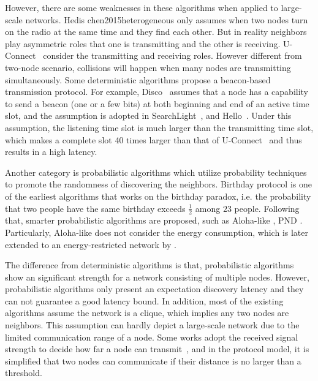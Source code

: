 However, there are some weaknesses in these algorithms when applied to large-scale networks.
Hedis {chen2015heterogeneous} only assumes when two nodes turn on the radio at the same time and they find each other. 
But in reality neighbors play asymmetric roles that one is transmitting and the other is receiving.
U-Connect~\cite{kandhalu2010u} consider the transmitting and receiving roles.
However different from two-node scenario, collisions will happen when many nodes are transmitting simultaneously. 
Some deterministic algorithms propose a beacon-based transmission protocol.
For example, Disco~\cite{dutta2008practical} assumes that a node has a capability to send a beacon (one or a few bits) at both beginning and end of an active time slot, and the assumption is adopted in 
SearchLight~\cite{bakht2012searchlight}, and Hello~\cite{sun2014hello}.
Under this assumption, the listening time slot is much larger than the transmitting time slot, which makes a complete slot 
40 times larger than that of U-Connect~\cite{kandhalu2010u} and thus results in a high latency.


Another category is probabilistic algorithms \cite{mcglynn2001birthday,
vasudevan2009neighbor,you2011aloha,song2014probabilistic} which utilize probability techniques to promote the randomness
of discovering the neighbors. 
Birthday protocol \cite{mcglynn2001birthday} is one of the earliest algorithms that works on the birthday
paradox, i.e. the probability that two people have the same
birthday exceeds $\frac{1}{2}$ among $23$ people. Following that,
smarter probabilistic algorithms are proposed, such as Aloha-like \cite{vasudevan2009neighbor, you2011aloha}, PND \cite{song2014probabilistic}. Particularly, Aloha-like \cite{vasudevan2009neighbor} does not consider the energy consumption, which is later extended to an energy-restricted network by \cite{you2011aloha}.

The difference from deterministic algorithms is that,
probabilistic algorithms show an significant strength for a network consisting of multiple nodes.
However, probabilistic algorithms only present an expectation discovery latency and they
can not guarantee a good latency bound.
In addition, most of the existing algorithms assume the network is a clique, which implies any two nodes are neighbors. 
This assumption can hardly depict a large-scale network due to the limited communication range of a node.
Some works adopt the received signal strength to decide how far a node can transmit~\cite{daiya2011experimental}, and in the protocol model, it is simplified that two nodes can communicate if their distance is no larger than a threshold.


